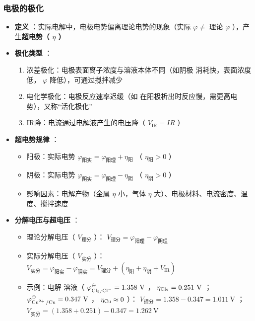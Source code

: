 \subsubsection{电极的极化} 
\begin{itemize} 
    \item \textbf{定义} ：实际电解中，电极电势偏离理论电势的现象（实际 $ \varphi \neq $ 理论 $ \varphi $ ），产生\textbf{超电势（ $ \eta $ ）} 
    \item \textbf{极化类型} ：
    \begin{enumerate} 
        \item 浓差极化：电极表面离子浓度与溶液本体不同（如阴极  消耗快，表面浓度低， $ \varphi $ 降低），可通过搅拌减少
        \item 电化学极化：电极反应速率迟缓（如  在阳极析出时反应慢，需更高电势），又称“活化极化”
        \item IR降：电流通过电解液产生的电压降（ $ V_{\text{IR} }  = IR $ ）
    \end{enumerate} 
    
    \item \textbf{超电势规律} ：
    \begin{itemize} 
        \item 阳极：实际电势 $ \varphi_{\text{阳实} }  = \varphi_{\text{阳理} }  + \eta_{\text{阳} }  $ （ $ \eta_{\text{阳} }  > 0 $ ）
        \item 阴极：实际电势 $ \varphi_{\text{阴实} }  = \varphi_{\text{阴理} }  - \eta_{\text{阴} }  $ （ $ \eta_{\text{阴} }  > 0 $ ）
        \item 影响因素：电解产物（金属 $ \eta $ 小，气体 $ \eta $ 大）、电极材料、电流密度、温度、搅拌速度
    \end{itemize} 
    
    \item \textbf{分解电压与超电压} ：
    \begin{itemize} 
        \item 理论分解电压（ $ V_{\text{理分} }  $ ）： $ V_{\text{理分} }  = \varphi_{\text{阳理} }  - \varphi_{\text{阴理} }  $ 
        \item 实际分解电压（ $ V_{\text{实分} }  $ ）： $ V_{\text{实分} }  = \varphi_{\text{阳实} }  - \varphi_{\text{阴实} }  = V_{\text{理分} }  + (\eta_{\text{阳} }  + \eta_{\text{阴} }  + V_{\text{IR} } ) $ 
        \item 示例：电解  溶液（ $ \varphi_{ \ce{Cl2/Cl-} } ^\ominus = 1.358\ \text{V}  $ ， $ \eta_{ \ce{Cl2} }  = 0.251\ \text{V}  $ ； $ \varphi_{ \ce{Cu^{2+} /Cu} } ^\ominus = 0.347\ \text{V}  $ ， $ \eta_{ \ce{Cu} }  \approx 0 $ ）：  
         $ V_{\text{理分} }  = 1.358 - 0.347 = 1.011\ \text{V}  $ ；  
         $ V_{\text{实分} }  = (1.358 + 0.251) - 0.347 = 1.262\ \text{V}  $ 
    \end{itemize} 
\end{itemize} 

